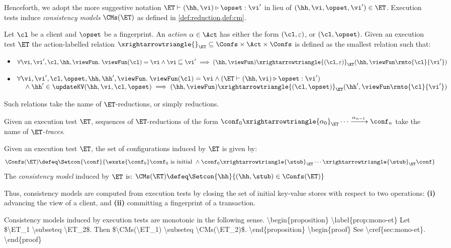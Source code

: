 Henceforth, we adopt the more suggestive notation $\ET \vdash (\hh, \vi) \triangleright \opset: \vi'$ 
in lieu of $(\hh, \vi, \opset, \vi') \in \ET$.
Execution tests induce \emph{consistency models} \( \CMs(\ET) \) as defined in \cref{def:reduction,def:cm}.
\begin{definition}[$\ET$-reductions]
\label{def:reduction}
Let $\cl$ be a client and $\opset$ be a fingerprint. 
An \emph{action} $\alpha \in \Act$ has either the form $(\cl, \varepsilon)$, 
or $(\cl, \opset)$. 
Given an execution test $\ET$ the action-labelled relation 
$\xrightarrowtriangle{}_{\ET} \subseteq \Confs \times \Act \times \Confs$ 
is defined as the smallest relation such that:
\begin{itemize}
\item 
    $\forall \vi, \vi', \cl, \hh, \viewFun.\; 
    \viewFun(\cl) = \vi 
    \wedge \vi \sqsubseteq \vi' 
    \implies (\hh, \viewFun) \xrightarrowtriangle{(\cl, \varepsilon)}_{\ET} 
    (\hh, \viewFun\rmto{\cl}{\vi'})$
\item 
    $\begin{array}[t]{@{}l@{}}
        \forall \vi, \vi', \cl, \opset, \hh, \hh', \viewFun.\; 
        \viewFun(\cl) = \vi
        \wedge (\ET \vdash (\hh, \vi) \triangleright \opset: \vi')  \\
        \quad {} \wedge \hh' \in \updateKV(\hh, \vi, \cl, \opset) 
        \implies (\hh, \viewFun) \xrightarrowtriangle{(\cl, \opset)}_{\ET} (\hh', \viewFun\rmto{\cl}{\vi'})
    \end{array}$
\end{itemize}
Such relations take the name of $\ET$-reductions, or simply reductions.
\end{definition}
Given an execution test $\ET$, sequences of $\ET$-reductions of the form $\conf_{0} \xrightarrowtriangle{\alpha_{0}}_{\ET} \cdots 
\xrightarrow{\alpha_{n-1}} \conf_{n}$ take the name of \emph{$\ET$-traces}.
\begin{definition}
\label{def:cm}
Given an execution test $\ET$, the set of configurations induced by $\ET$ is given by:
\[
\Confs(\ET) \defeq \Setcon{ \conf}{ \exsts{\conf_0} \conf_0 \text{ is initial } \wedge \conf_0 \xrightarrowtriangle{\stub}_{\ET} \cdots \xrightarrowtriangle{\stub}_{\ET} \conf }
\]
The \emph{consistency model} induced by $\ET$ is:
\( 
\CMs(\ET) \defeq \Setcon{ \hh }{ (\hh, \stub) \in \Confs(\ET) }
\)
\end{definition}
Thus, consistency models are computed from execution tests by closing the set of initial key-value stores with respect to two operations: 
\textbf{(i)} advancing the view of a client, 
and \textbf{(ii)} committing a fingerprint of a transaction. 

\ac{
Consistency models induced by execution tests are monotonic in the following sense.
\begin{proposition}
\label{prop:mono-et}
Let $\ET_1 \subseteq \ET_2$. Then $\CMs(\ET_1) \subseteq \CMs(\ET_2)$.
\end{proposition}
\begin{proof}
    See \cref{sec:mono-et}.
\end{proof}
}
